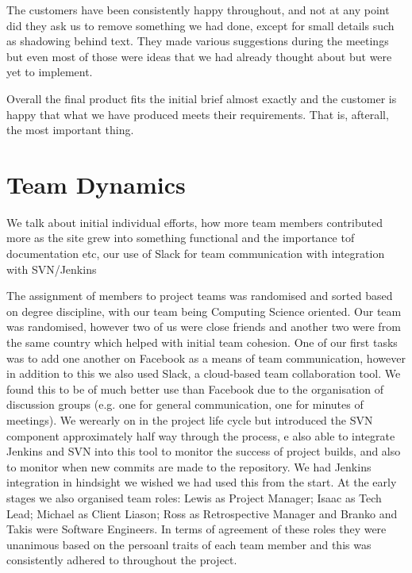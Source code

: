 \documentclass{l3proj}
\begin{document}
The customers have been consistently happy throughout, and not at any point did they ask us to remove something we had done, except for small details such 
as shadowing behind text. They made various suggestions during the meetings but even most of those were ideas that we had already thought about but were 
yet to implement.

Overall the final product fits the initial brief almost exactly and the customer is happy that what we have produced meets their requirements. That
is, afterall, the most important thing.



\section{Team Dynamics}

We talk about initial individual efforts, how more team members contributed more as the site grew into something functional
and the importance tof documentation etc, our use of Slack for team communication with integration with SVN/Jenkins

The assignment of members to project teams was randomised and sorted based on degree discipline, with our team being
Computing Science oriented. Our team was randomised, however two of us were close friends and another two were from the
same country which helped with initial team cohesion. One of our first tasks was to add one another on Facebook as a means of
team communication, however in addition to this we also used Slack, a cloud-based team collaboration tool. We found this to
be of much better use than Facebook due to the organisation of discussion groups (e.g. one for general communication, one for
minutes of meetings). We werearly on in the project life cycle
but introduced the SVN component approximately half way through the process, e also able to integrate Jenkins and SVN into this tool to monitor the success of project builds,
and also to monitor when new commits are made to the repository. We had Jenkins integration in hindsight we wished we had used this from the
start. At the early stages we also organised team roles: Lewis as Project Manager; Isaac as Tech Lead; Michael as Client Liason;
Ross as Retrospective Manager and Branko and Takis were Software Engineers. In terms of agreement of these roles they were unanimous
based on the persoanl traits of each team member and this was consistently adhered to throughout the project.
\end{document}
